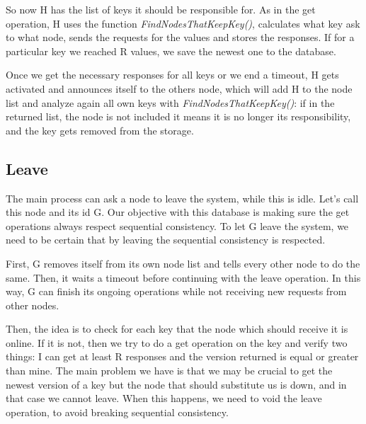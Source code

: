 \documentclass[12pt, a4paper]{article}
\begin{document}
    So now H has the list of keys it should be responsible for. As in the get operation, H uses the function \textit{FindNodesThatKeepKey()}, calculates what key ask to what node, sends the requests for the values and stores the responses. If for a particular key we reached R values, we save the newest one to the database.

    Once we get the necessary responses for all keys or we end a timeout, H gets activated and announces itself to the others node, which will add H to the node list and analyze again all own keys with \textit{FindNodesThatKeepKey()}: if in the returned list, the node is not included it means it is no longer its responsibility, and the key gets removed from the storage.
    
    \pagebreak
    \subsection{Leave}
    The main process can ask a node to leave the system, while this is idle. Let’s call this node and its id G. Our objective with this database is making sure the get operations always respect sequential consistency. To let G leave the system, we need to be certain that by leaving the sequential consistency is respected. 

    First, G removes itself from its own node list and tells every other node to do the same. Then, it waits a timeout before continuing with the leave operation. In this way, G can finish its ongoing operations while not receiving new requests from other nodes.

    Then, the idea is to check for each key that the node which should receive it is online. If it is not, then we try to do a get operation on the key and verify two things: I can get at least R responses and the version returned is equal or greater than mine. The main problem we have is that we may be crucial to get the newest version of a key but the node that should substitute us is down, and in that case we cannot leave. When this happens, we need to void the leave operation, to avoid breaking sequential consistency.

\end{document}
